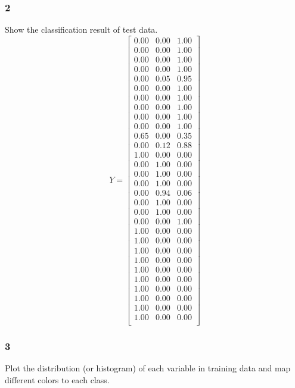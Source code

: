 \documentclass{article}
\begin{document}
\subsubsection*{2} Show the classification result of test data.
\[
Y=\begin{bmatrix}
0.00 & 0.00 & 1.00 \\
0.00 & 0.00 & 1.00 \\
0.00 & 0.00 & 1.00 \\
0.00 & 0.00 & 1.00 \\
0.00 & 0.05 & 0.95 \\
0.00 & 0.00 & 1.00 \\
0.00 & 0.00 & 1.00 \\
0.00 & 0.00 & 1.00 \\
0.00 & 0.00 & 1.00 \\
0.00 & 0.00 & 1.00 \\
0.65 & 0.00 & 0.35 \\
0.00 & 0.12 & 0.88 \\
1.00 & 0.00 & 0.00 \\
0.00 & 1.00 & 0.00 \\
0.00 & 1.00 & 0.00 \\
0.00 & 1.00 & 0.00 \\
0.00 & 0.94 & 0.06 \\
0.00 & 1.00 & 0.00 \\
0.00 & 1.00 & 0.00 \\
0.00 & 0.00 & 1.00 \\
1.00 & 0.00 & 0.00 \\
1.00 & 0.00 & 0.00 \\
1.00 & 0.00 & 0.00 \\
1.00 & 0.00 & 0.00 \\
1.00 & 0.00 & 0.00 \\
1.00 & 0.00 & 0.00 \\
1.00 & 0.00 & 0.00 \\
1.00 & 0.00 & 0.00 \\
1.00 & 0.00 & 0.00 \\
1.00 & 0.00 & 0.00 \\
\end{bmatrix}
\]
\subsubsection*{3}Plot the distribution (or histogram) of each variable in training data and map different colors to each class.
\end{document}
